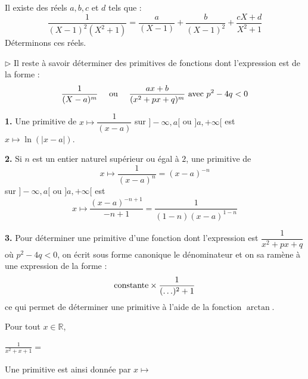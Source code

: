 \documentclass[french,11pt,twoside]{VcCours}
\begin{document}
\begin{Exemple} Il existe des réels $a,b,c$ et $d$ tels que :
$$ \dfrac{1}{(X-1)^2 (X^2+1)} = \frac{a}{(X-1)} + \frac{b}{(X-1)^2} + \frac{cX+d}{X^2+1}$$
Déterminons ces réels.

\vspace{11cm}
\end{Exemple}

\medskip 

$\rhd$ Il reste à savoir déterminer des primitives de fonctions dont l'expression est de la forme :
$$ \frac{1}{(X-a)^m} \quad \hbox{ ou }  \quad\frac{ax+b}{(x^2+px+q)^m} \hbox{ avec } p^2-4q<0$$


\textbf{1.} Une primitive de $x \mapsto \dfrac{1}{(x-a)}$ sur $]-\infty,a[$ ou $]a, + \infty[$ est $x \mapsto \ln( \vert x-a \vert)$.

\textbf{2.} Si $n$ est un entier naturel supérieur ou égal à $2$, une primitive de 
$$x \mapsto \dfrac{1}{(x-a)^n}= (x-a)^{-n}$$ sur $]-\infty,a[$ ou $]a, + \infty[$ est 
$$x \mapsto \dfrac{(x-a)^{-n+1}}{-n+1} = \dfrac{1}{(1-n)(x-a)^{1-n}} $$

\textbf{3.} Pour déterminer une primitive d'une fonction dont l'expression est $\dfrac{1}{x^2+px+q}$ où $p^2-4q<0$, on écrit sous forme canonique le dénominateur et on sa ramène à une expression de la forme :
$$ \hbox{constante} \times \frac{1}{(\ldots)^2+1}$$
ce qui permet de déterminer une primitive à l'aide de la fonction $\arctan$. 

\begin{Exemple} Pour tout $x \in \mathbb{R}$,

\medskip
\quad \qquad $\frac{1}{x^2+x+1} =$
 
 \vspace{10cm}
% 
% 
% 
Une primitive est ainsi donnée par $x \mapsto \phantom{\frac{2}{\sqrt{3}} \arctan \left( \frac{2x+1}{\sqrt{3}} \right)\cdot}$
\end{Exemple}
\end{document}
